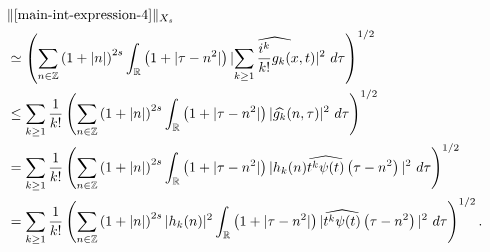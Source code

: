 \documentclass[handout]{beamer}
\numberwithin{equation}{section}
\newcommand{\rr}{\mathbb{R}}
\newcommand{\zz}{\mathbb{Z}}
\newcommand{\wh}{\widehat}
\begin{document}
\begin{frame}

%
%
\begin{equation}
	\label{2n}
	\begin{split}
		& \|\eqref{main-int-expression-4}\|_{X_s} 
		\\
		& \simeq \left( \sum_{n \in \zz} \left(1 + |n| \right)^{2s} \int_\rr \left( 1 + | \tau -
		n^{2 }
		|
		\right) | \wh{\sum_{k \ge 1} \frac{i^k}{k!}g_k(x,t)} |^2 \ d \tau
		\right)^{1/2}
		\\
		& \le \sum_{k \ge 1} \frac{1}{k!}\left( \sum_{n \in \zz} \left(1 + |n| \right)^{2s}
		\int_\rr \left( 1 + | \tau - n^{2 } | \right) | \wh{g_k}(n, \tau) |^2 \
		d \tau \right)^{1/2}
		\\
		& = \sum_{k \ge 1} \frac{1}{k!} \left( \sum_{n \in \zz} \left(1 + |n| \right)^{2s}
		\int_\rr \left( 1 + | \tau - n^{2 } | \right) | h_k(n) \wh{t^k
		\psi(t)} \left( \tau - n^{2 } \right) |^2 \ d \tau \right)^{1/2}
		\\
		& = \sum_{k \ge 1} \frac{1}{k!} \left( \sum_{n \in \zz} \left(1 + |n| \right)^{2s} |
		h_k(n) |^2 \int_\rr \left( 1 + | \tau - n^{2 } | \right) | \wh{t^k
		\psi(t)} \left( \tau - n^{2 } \right) |^2 \ d \tau \right)^{1/2}.
	\end{split}
\end{equation}
%
%
\end{frame}
\end{document}
